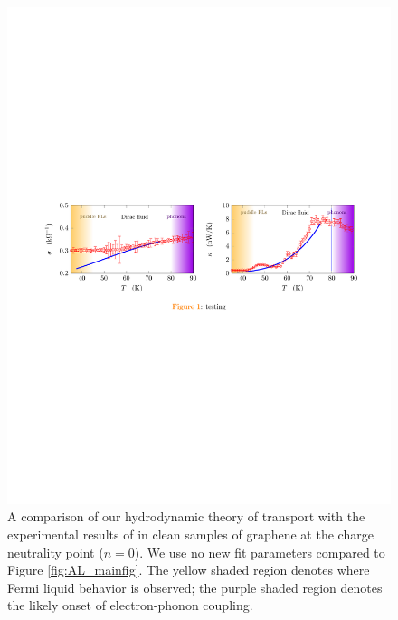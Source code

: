 \begin{figure}
\centering
\includegraphics[width=7in]{figures/hydro_theory/mainfigTplot.pdf}
\caption{A comparison of our hydrodynamic theory of transport with the experimental results of \cite{crossno_observation_2016} in clean samples of graphene at the charge neutrality point ($n=0$).  We use no new fit parameters compared to Figure \ref{fig:AL_mainfig}. The yellow shaded region denotes where Fermi liquid behavior is observed; the purple shaded region denotes the likely onset of electron-phonon coupling.}
\label{fig:AL_mainfigT}
\end{figure}


